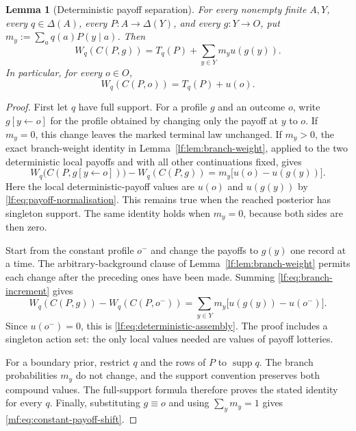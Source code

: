 \documentclass[11pt,a4paper]{article}
\newtheorem{lemma}[theorem]{Lemma}
\theoremstyle{definition}
\newcommand{\D}{\Delta}
\newcommand{\supp}{\operatorname{supp}}
\newcommand{\1}{\mathbf 1}
\begin{document}
\begin{lemma}[Deterministic payoff separation]
\label{lf:lem:deterministic-assembly}\label{lf:lem:branch-increment}
For every nonempty finite $A,Y$, every $q\in\D(A)$, every
$P:A\to\D(Y)$, and every $g:Y\to O$, put
$m_y:=\sum_aq(a)P(y\mid a)$.  Then
\begin{equation}
W_q(C(P,g))=T_q(P)+\sum_{y\in Y}m_yu(g(y)).
\label{lf:eq:deterministic-assembly}
\end{equation}
In particular, for every $o\in O$,
\begin{equation}
W_q(C(P,o))=T_q(P)+u(o).
\label{mf:eq:constant-payoff-shift}
\end{equation}
\end{lemma}

\begin{proof}
First let $q$ have full support.  For a profile $g$ and an outcome $o$, write
$g[y\leftarrow o]$ for the profile obtained by changing only the payoff at
$y$ to $o$.  If $m_y=0$, this change leaves the marked terminal law unchanged.
If $m_y>0$, the exact branch-weight identity in
Lemma~\ref{lf:lem:branch-weight}, applied to the two deterministic local
payoffs and with all other continuations fixed, gives
\begin{equation}
W_q\bigl(C(P,g[y\leftarrow o])\bigr)-W_q(C(P,g))
=m_y\bigl[u(o)-u(g(y))\bigr].
\label{lf:eq:branch-increment}
\end{equation}
Here the local deterministic-payoff values are $u(o)$ and $u(g(y))$ by
\eqref{lf:eq:payoff-normalisation}.  This remains true when the reached
posterior has singleton support.  The same identity holds when $m_y=0$,
because both sides are then zero.

Start from the constant profile $o^-$ and change the payoffs to $g(y)$ one
record at a time.  The arbitrary-background clause of
Lemma~\ref{lf:lem:branch-weight} permits each change after the preceding
ones have been made.  Summing \eqref{lf:eq:branch-increment} gives
\begin{equation}
W_q(C(P,g))-W_q(C(P,o^-))
=\sum_{y\in Y}m_y\bigl[u(g(y))-u(o^-)\bigr].
\label{lf:eq:telescope}
\end{equation}
Since $u(o^-)=0$, this is \eqref{lf:eq:deterministic-assembly}.
The proof includes a singleton action set: the only local values needed
are values of payoff lotteries.

For a boundary prior, restrict $q$ and the rows of $P$ to $\supp q$.
The branch probabilities $m_y$ do not change, and the support convention
preserves both compound values.  The full-support formula therefore proves
the stated identity for every $q$.  Finally, substituting $g\equiv o$ and
using $\sum_y m_y=1$ gives \eqref{mf:eq:constant-payoff-shift}.
\end{proof}
\end{document}
